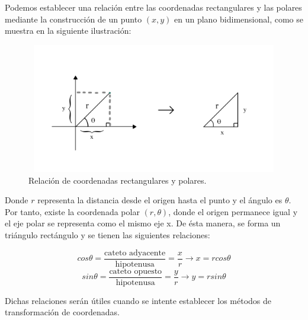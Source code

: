 Podemos establecer una relación entre las coordenadas rectangulares y las polares mediante la construcción de un punto $(x,y)$ en un plano bidimensional, como se muestra en la siguiente ilustración:

\begin{figure}[H]
  \centering
  \includegraphics[width=11.17cm, height=5.67cm]{img/graph/relacion_r}
  \caption{Relación de coordenadas rectangulares y polares.}
  \label{relacion_de_coordenadas}
\end{figure}

Donde $r$ representa la distancia desde el origen hasta el punto y el ángulo es $\theta$. Por tanto, existe la coordenada polar $(r,\theta)$, donde el origen permanece igual y el eje polar se representa como el mismo eje x. De ésta manera, se forma un triángulo rectángulo y se tienen las siguientes relaciones:

\[cos\theta = \frac{\text{cateto adyacente}}{\text{hipotenusa}} = \frac{x}{r} \rightarrow x = rcos\theta\]
\[sin\theta = \frac{\text{cateto opuesto}}{\text{hipotenusa}} = \frac{y}{r} \rightarrow y = rsin\theta\]

\vspace{4mm}
Dichas relaciones serán útiles cuando se intente establecer los métodos de transformación de coordenadas.

